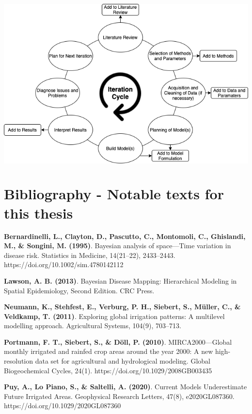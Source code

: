 \documentclass[12pt]{extarticle}
\begin{document}
\begin{center}
   \includegraphics[width=14cm]{Iteration.png}
\end{center}

\section{Bibliography - Notable texts for this thesis}


\textbf{Bernardinelli, L., Clayton, D., Pascutto, C., Montomoli, C., Ghislandi, M., & Songini, M. (1995)}. Bayesian analysis of space—Time variation in disease risk. Statistics in Medicine, 14(21–22), 2433–2443. 
\linebreak https://doi.org/10.1002/sim.4780142112

\textbf{Lawson, A. B. (2013)}. Bayesian Disease Mapping: Hierarchical Modeling in Spatial Epidemiology, Second Edition. CRC Press.

\textbf{Neumann, K., Stehfest, E., Verburg, P. H., Siebert, S., Müller, C., & Veldkamp, T. (2011)}. Exploring global irrigation patterns: A multilevel modelling approach. Agricultural Systems, 104(9), 703–713.

\textbf{Portmann, F. T., Siebert, S., & Döll, P. (2010)}. MIRCA2000—Global monthly irrigated and rainfed crop areas around the year 2000: A new high-resolution data set for agricultural and hydrological modeling. Global Biogeochemical Cycles, 24(1). https://doi.org/10.1029/2008GB003435

\textbf{Puy, A., Lo Piano, S., & Saltelli, A. (2020)}. Current Models Underestimate Future Irrigated Areas. Geophysical Research Letters, 47(8), e2020GL087360. https://doi.org/10.1029/2020GL087360
\end{document}
